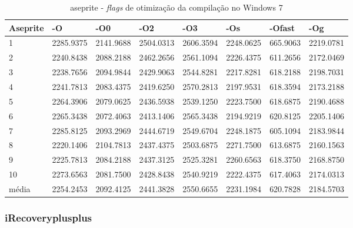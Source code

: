 \begin{apendicesenv}
\begin{table}[!ht]
\tiny
\centering
\caption{aseprite - \textit{flags} de otimização da compilação no Windows 7}
\label{tab:otimizacao_compilacao:windows:aseprite}
\begin{tabular}{llllllll}
\textbf{Aseprite} & \textbf{-O}  & \textbf{-O0}   & \textbf{-O2} & \textbf{-O3} & \textbf{-Os} & \textbf{-Ofast} & \textbf{-Og} \\ \toprule
1                 &  2285.9375   &  2141.9688     & 2504.0313    &  2606.3594   &  2248.0625   & 665.9063        &  2219.0781   \\ 
2                 &  2240.8438   &  2088.2188     & 2462.2656    &  2561.1094   &  2226.4375   & 611.2656        &  2172.0469   \\ 
3                 &  2238.7656   &  2094.9844     & 2429.9063    &  2544.8281   &  2217.8281   & 618.2188        &  2198.7031   \\ 
4                 &  2241.7813   &  2083.4375     & 2419.6250    &  2570.2813   &  2197.9531   & 618.3594        &  2173.2188   \\ 
5                 &  2264.3906   &  2079.0625     & 2436.5938    &  2539.1250   &  2223.7500   & 618.6875        &  2190.4688   \\ 
6                 &  2265.3438   &  2072.4063     & 2413.1406    &  2565.3438   &  2194.9219   & 620.8125        &  2205.1406   \\ 
7                 &  2285.8125   &  2093.2969     & 2444.6719    &  2549.6704   &  2248.1875   & 605.1094        &  2183.9844   \\ 
8                 &  2220.1406   &  2104.7813     & 2437.4375    &  2503.6875   &  2271.7500   & 613.6875        &  2160.1563   \\ 
9                 &  2225.7813   &  2084.2188     & 2437.3125    &  2525.3281   &  2260.6563   & 618.3750        &  2168.8750   \\ 
10                &  2273.6563   &  2081.7500     & 2428.8438    &  2540.9219   &  2222.4375   & 617.4063        &  2174.0313   \\ \bottomrule
média             &  2254.2453   &  2092.4125     & 2441.3828    &  2550.6655   &  2231.1984   & 620.7828        &  2184.5703   \\ 
\end{tabular}
\end{table}

\clearpage
\subsubsection*{iRecoveryplusplus}


\end{apendicesenv}
